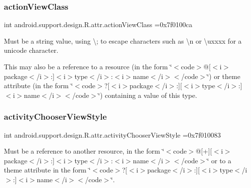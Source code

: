 \subsubsection{\texorpdfstring{action\+View\+Class}{actionViewClass}}
{\footnotesize\ttfamily int android.\+support.\+design.\+R.\+attr.\+action\+View\+Class =0x7f0100ca\hspace{0.3cm}{\ttfamily [static]}}

Must be a string value, using \textquotesingle{}\textbackslash{};\textquotesingle{} to escape characters such as \textquotesingle{}\textbackslash{}n\textquotesingle{} or \textquotesingle{}\textbackslash{}uxxxx\textquotesingle{} for a unicode character. 

This may also be a reference to a resource (in the form \char`\"{}$<$code$>$@\mbox{[}$<$i$>$package$<$/i$>$\+:\mbox{]}$<$i$>$type$<$/i$>$\+:$<$i$>$name$<$/i$>$$<$/code$>$\char`\"{}) or theme attribute (in the form \char`\"{}$<$code$>$?\mbox{[}$<$i$>$package$<$/i$>$\+:\mbox{]}\mbox{[}$<$i$>$type$<$/i$>$\+:\mbox{]}$<$i$>$name$<$/i$>$$<$/code$>$\char`\"{}) containing a value of this type. \mbox{\label{classandroid_1_1support_1_1design_1_1R_1_1attr_a1fd291fa96a1945e4080966723e44cef}} 
\subsubsection{\texorpdfstring{activity\+Chooser\+View\+Style}{activityChooserViewStyle}}
{\footnotesize\ttfamily int android.\+support.\+design.\+R.\+attr.\+activity\+Chooser\+View\+Style =0x7f010083\hspace{0.3cm}{\ttfamily [static]}}

Must be a reference to another resource, in the form \char`\"{}$<$code$>$@\mbox{[}+\mbox{]}\mbox{[}$<$i$>$package$<$/i$>$\+:\mbox{]}$<$i$>$type$<$/i$>$\+:$<$i$>$name$<$/i$>$$<$/code$>$\char`\"{} or to a theme attribute in the form \char`\"{}$<$code$>$?\mbox{[}$<$i$>$package$<$/i$>$\+:\mbox{]}\mbox{[}$<$i$>$type$<$/i$>$\+:\mbox{]}$<$i$>$name$<$/i$>$$<$/code$>$\char`\"{}. \mbox{\label{classandroid_1_1support_1_1design_1_1R_1_1attr_a9b0a2f5e8a1665173335cee8864fe659}} 
